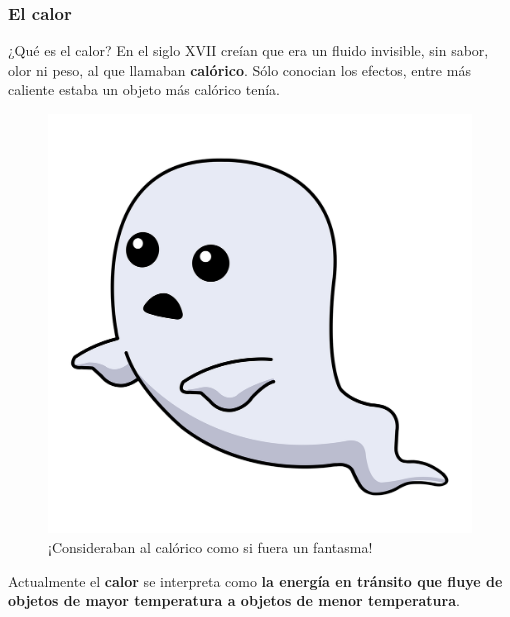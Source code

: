 \documentclass[handout]{beamer}
\begin{document}
\begin{frame}
  \frametitle{El calor}


  \begin{block}{¿Qué es el calor?}
    En el siglo XVII creían que era un fluido invisible, sin sabor, olor ni peso, al que
    llamaban \textbf{calórico}. Sólo conocian los efectos, entre más caliente estaba un objeto más
    calórico tenía.
  \end{block}


  \begin{center}
    \begin{figure}[h]
      \centering
      \includegraphics[scale=0.08]{ghost}
    \caption{¡Consideraban al calórico como si fuera un fantasma!}
  \end{figure}
  \end{center}
  
  Actualmente el \textbf{calor} se interpreta como \textbf{la energía en tránsito que fluye de
    objetos de mayor temperatura a objetos de menor temperatura}.
  
\end{frame}
\end{document}

